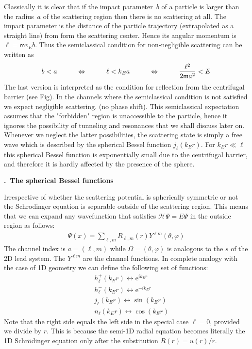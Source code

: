 \documentclass[onecolumn,fleqn, 11pt]{revtex4}
\newcommand{\eexp}{\mathrm{e}^}
\newcommand{\mass}{\mathsf{m}}
\newcommand{\beq}{\begin{eqnarray}}
\newcommand{\eeq}{\end{eqnarray}}
\renewcommand{\thesubsection}{\arabic{subsection}}
\renewcommand{\thesubsubsection}{\arabic{subsubsection}}
\newcommand{\sheadC}[1]
{
\addtocounter{subsubsection}{1}
\vspace{5mm}
{\bf \thesubsection.\thesubsubsection \ #1}  
\nopagebreak
\phantomsection
}
\begin{document}
Classically it is clear that if the impact parameter~$b$
of a particle is larger than the radius~$a$ of the 
scattering region then there is no scattering at all.
The impact parameter is the distance of the particle 
trajectory (extrapolated as a straight line) from 
form the scattering center. Hence its angular momentum 
is $\ell=\mass v_E b$. Thus the semiclassical condition 
for  non-negligible scattering can be written as 
\beq
b<a 
\hspace*{1cm}\Leftrightarrow\hspace*{1cm}
\ell < k_Ea
\hspace*{1cm}\Leftrightarrow\hspace*{1cm} 
\frac{\ell^2}{2\mass a^2} < E
\eeq
The last version is interpreted as the condition 
for reflection from the centrifugal barrier (see Fig). 
In the channels where the semiclassical condition 
is not satisfied we expect negligible scattering. 
(no phase shift). This semiclassical expectation 
assumes that the "forbidden" region is unaccessible 
to the particle, hence it ignores the possibility 
of tunneling and resonances that we shall discuss later on.  
Whenever we neglect the latter possibilities, the scattering 
state is simply a free wave which is described by 
the spherical Bessel function $j_{\ell}(k_E r)$.  
For $k_E r \ll \ell$ this spherical Bessel function 
is exponentially small due to the centrifugal barrier,
and therefore it is hardly affected by the presence 
of the sphere.






\sheadC{The spherical Bessel functions}


Irrespective of whether the scattering 
potential is spherically symmetric 
or not the Schrodinger equation is 
separable outside of the scattering region.
This means that we can expand 
any wavefunction that satisfies 
${\mathcal{H}\Psi =E\Psi}$ 
in the outside region as follows:
\beq
\Psi(x)= \sum_{\ell,m} R_{\ell, m}(r) Y^{\ell m}(\theta,\varphi)
\eeq
The channel index is $a=(\ell,m)$ while $\Omega=(\theta,\varphi)$ 
is analogous to the $s$ of the 2D lead system. 
The  $Y^{\ell m}$ are the channel functions. 
In complete analogy with the case of 1D geometry 
we can define the following set of functions: 
\beq
&& h^{+}_{\ell}(k_Er)   \leftrightarrow \eexp{ik_Er} 
\\ \nonumber
&& h^{-}_{\ell}(k_Er) \leftrightarrow \eexp{-ik_Er} 
\\ \nonumber
&& j_{\ell}(k_Er) \leftrightarrow \sin(k_Er)   
\\ \nonumber
&& n_{\ell}(k_Er) \leftrightarrow \cos(k_Er)
\eeq
Note that the right side equals the 
left side in the special case $\ell=0$, 
provided we divide by $r$. This is because 
the semi-1D radial equation becomes literally 
the 1D Schr\"{o}dinger equation only after the 
substitution $R(r)=u(r)/r$.
\end{document}
